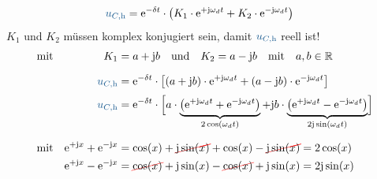 \begin{frame}[t]
\ifvmode\vspace*{-\baselineskip}\setlength{\parskip}{0ex}\fi%
\begin{align*}
    \ecv{u_{C,\mathrm{h}}} &= \mathrm{e}^{-\delta t} \cdot \left( K_1 \cdot \mathrm{e}^{+\mathrm{j}\omega_d t} + K_2 \cdot \mathrm{e}^{-\mathrm{j}\omega_d t} \right)
\end{align*}%
$K_1$ und $K_2$ müssen komplex konjugiert sein, damit $\ecv{u_{C,\mathrm{h}}}$ reell ist! 
\begin{align}
&\text{mit}&
        K_1 &= a + \mathrm{j} b \mathrlap{\quad\text{und}\quad K_2 = a - \mathrm{j} b\quad\text{mit}\quad a,b \in \mathbb{R}} \nonumber\\[6pt]
    &&
        \ecv{u_{C,\mathrm{h}}} &= \mathrm{e}^{-\delta t} \cdot \left[ (a + \mathrm{j} b) \cdot \mathrm{e}^{+\mathrm{j}\omega_d t} + (a - \mathrm{j} b) \cdot \mathrm{e}^{-\mathrm{j}\omega_d t} \right] \nonumber\\[2pt]
    &&
        \ecv{u_{C,\mathrm{h}}} &= \mathrm{e}^{-\delta t} \cdot
            \left[\vphantom{\Big|}
            \smash{ a \cdot
            \underbrace{\left(
                \mathrm{e}^{+\mathrm{j}\omega_d t} + \mathrm{e}^{-\mathrm{j}\omega_d t}
            \right)}_{2\cos(\omega_d t)}
            + \mathrm{j} b \cdot
            \underbrace{\left(
                \mathrm{e}^{+\mathrm{j}\omega_d t} - \mathrm{e}^{-\mathrm{j}\omega_d t}
            \right)}_{2\mathrm{j}\sin(\omega_d t)}
            }\right] \nonumber\\[20pt]
    &\text{mit}&
        \mathrm{e}^{+\mathrm{j}x} + \mathrm{e}^{-\mathrm{j}x} &= \cos(x) + \redcancel{\mathrm{j}\sin(x)} + \cos(x) - \redcancel{\mathrm{j}\sin(x)} = 2\cos(x) \nonumber\\
    &&
        \mathrm{e}^{+\mathrm{j}x} - \mathrm{e}^{-\mathrm{j}x} &= \redcancel{\cos(x)} + \mathrm{j}\sin(x) - \redcancel{\cos(x)} + \mathrm{j}\sin(x) = 2\mathrm{j}\sin(x) \nonumber\\[6pt]

\end{align}
\end{frame}
